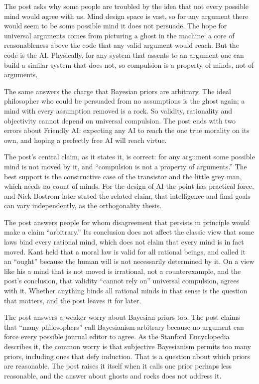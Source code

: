 \begin{afterword}
\summaryhead

The post asks why some people are troubled by the idea that not every possible mind would agree with us. Mind design space is vast, so for any argument there would seem to be some possible mind it does not persuade. The hope for universal arguments comes from picturing a ghost in the machine: a core of reasonableness above the code that any valid argument would reach. But the code is the AI. Physically, for any system that assents to an argument one can build a similar system that does not, so compulsion is a property of minds, not of arguments.

The same answers the charge that Bayesian priors are arbitrary. The ideal philosopher who could be persuaded from no assumptions is the ghost again; a mind with every assumption removed is a rock. So validity, rationality and objectivity cannot depend on universal compulsion. The post ends with two errors about Friendly AI: expecting any AI to reach the one true morality on its own, and hoping a perfectly free AI will reach virtue.

\responsehead

The post's central claim, as it states it, is correct: for any argument some possible mind is not moved by it, and ``compulsion is not a property of arguments.'' The best support is the constructive case of the transistor and the little grey man, which needs no count of minds. For the design of AI the point has practical force, and Nick Bostrom later stated the related claim, that intelligence and final goals can vary independently, as the orthogonality thesis.

The post answers people for whom disagreement that persists in principle would make a claim ``arbitrary.'' Its conclusion does not affect the classic view that some laws bind every rational mind, which does not claim that every mind is in fact moved. Kant held that a moral law is valid for all rational beings, and called it an ``ought'' because the human will is not necessarily determined by it. On a view like his a mind that is not moved is irrational, not a counterexample, and the post's conclusion, that validity ``cannot rely on'' universal compulsion, agrees with it. Whether anything binds all rational minds in that sense is the question that matters, and the post leaves it for later.

The post answers a weaker worry about Bayesian priors too. The post claims that ``many philosophers'' call Bayesianism arbitrary because no argument can force every possible journal editor to agree. As the Stanford Encyclopedia describes it, the common worry is that subjective Bayesianism permits too many priors, including ones that defy induction. That is a question about which priors are reasonable. The post raises it itself when it calls one prior perhaps less reasonable, and the answer about ghosts and rocks does not address it.


\end{afterword}
